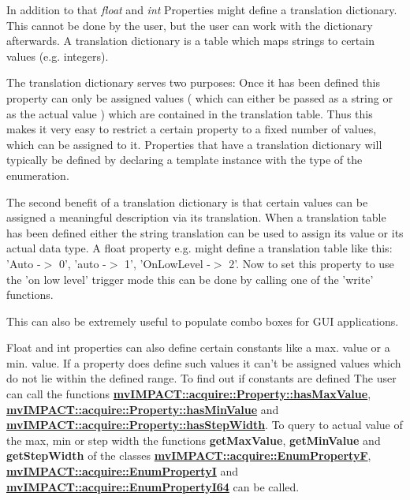 In addition to that {\itshape float} and {\itshape int} Properties might define a translation dictionary. This cannot be done by the user, but the user can work with the dictionary afterwards. A translation dictionary is a table which maps strings to certain values (e.\+g. integers).

The translation dictionary serves two purposes\+: Once it has been defined this property can only be assigned values ( which can either be passed as a string or as the actual value ) which are contained in the translation table. Thus this makes it very easy to restrict a certain property to a fixed number of values, which can be assigned to it. Properties that have a translation dictionary will typically be defined by declaring a template instance with the type of the enumeration.

The second benefit of a translation dictionary is that certain values can be assigned a meaningful description via its translation. When a translation table has been defined either the string translation can be used to assign its value or its actual data type. A float property e.\+g. might define a translation table like this\+: 'Auto -\/$>$ 0', 'auto -\/$>$ 1', 'On\+Low\+Level -\/$>$ 2'. Now to set this property to use the 'on low level' trigger mode this can be done by calling one of the 'write' functions.

This can also be extremely useful to populate combo boxes for G\+U\+I applications.

Float and int properties can also define certain constants like a max. value or a min. value. If a property does define such values it can't be assigned values which do not lie within the defined range. To find out if constants are defined The user can call the functions {\bfseries \hyperlink{classmv_i_m_p_a_c_t_1_1acquire_1_1_property_a8fbc59e51ec6bf739d054078a5aa3021}{mv\+I\+M\+P\+A\+C\+T\+::acquire\+::\+Property\+::has\+Max\+Value}}, {\bfseries \hyperlink{classmv_i_m_p_a_c_t_1_1acquire_1_1_property_ab94e2773892274787f6745a133493ebb}{mv\+I\+M\+P\+A\+C\+T\+::acquire\+::\+Property\+::has\+Min\+Value}} and {\bfseries \hyperlink{classmv_i_m_p_a_c_t_1_1acquire_1_1_property_a8b42a3292260a81fc6b72c85934d5564}{mv\+I\+M\+P\+A\+C\+T\+::acquire\+::\+Property\+::has\+Step\+Width}}. To query to actual value of the max, min or step width the functions {\bfseries get\+Max\+Value}, {\bfseries get\+Min\+Value} and {\bfseries get\+Step\+Width} of the classes {\bfseries \hyperlink{classmv_i_m_p_a_c_t_1_1acquire_1_1_enum_property_f}{mv\+I\+M\+P\+A\+C\+T\+::acquire\+::\+Enum\+Property\+F}}, {\bfseries \hyperlink{classmv_i_m_p_a_c_t_1_1acquire_1_1_enum_property_i}{mv\+I\+M\+P\+A\+C\+T\+::acquire\+::\+Enum\+Property\+I}} and {\bfseries \hyperlink{classmv_i_m_p_a_c_t_1_1acquire_1_1_enum_property_i64}{mv\+I\+M\+P\+A\+C\+T\+::acquire\+::\+Enum\+Property\+I64}} can be called.


